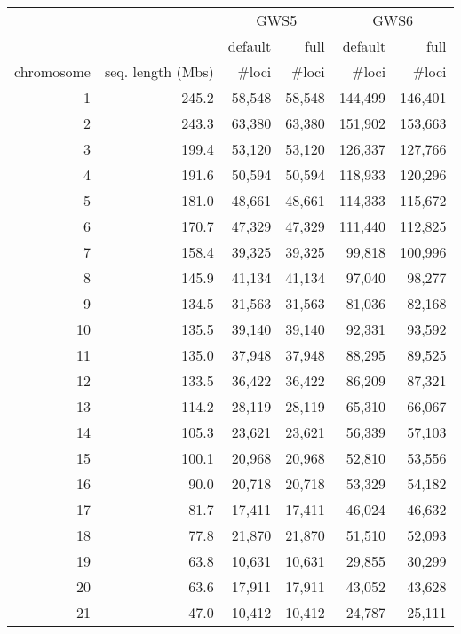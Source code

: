 \documentclass[10pt,a4paper]{article}
\newcommand{\GWSFive}{GWS5\xspace}
\newcommand{\GWSSix}{GWS6\xspace}
\begin{document}
\begin{table}[htp]
\begin{center}
\begin{tabular}{|r|r||rr||rr|}
\hline
     & & \multicolumn{2}{c||}{\GWSFive} & \multicolumn{2}{c|}{\GWSSix} \\
     & & default & full & default & full \\
chromosome & seq. length (Mbs) & \#loci & \#loci & \#loci & \#loci \\
\hline
\hline
1  & 245.2   & 58,548  &  58,548  &  144,499  &  146,401  \\
2  & 243.3   & 63,380  &  63,380  &  151,902  &  153,663  \\
3  & 199.4   & 53,120  &  53,120  &  126,337  &  127,766  \\
4  & 191.6   & 50,594  &  50,594  &  118,933  &  120,296  \\
5  & 181.0   & 48,661  &  48,661  &  114,333  &  115,672  \\
6  & 170.7   & 47,329  &  47,329  &  111,440  &  112,825  \\
7  & 158.4   & 39,325  &  39,325  &   99,818  &  100,996  \\
8  & 145.9   & 41,134  &  41,134  &   97,040  &   98,277  \\
9  & 134.5   & 31,563  &  31,563  &   81,036  &   82,168  \\
10 & 135.5   & 39,140  &  39,140  &   92,331  &   93,592  \\
\hline
11 & 135.0   & 37,948  &  37,948  &   88,295  &   89,525  \\
12 & 133.5   & 36,422  &  36,422  &   86,209  &   87,321  \\
13 & 114.2   & 28,119  &  28,119  &   65,310  &   66,067  \\
14 & 105.3   & 23,621  &  23,621  &   56,339  &   57,103  \\
15 & 100.1   & 20,968  &  20,968  &   52,810  &   53,556  \\
16 &  90.0   & 20,718  &  20,718  &   53,329  &   54,182  \\
17 &  81.7   & 17,411  &  17,411  &   46,024  &   46,632  \\
18 &  77.8   & 21,870  &  21,870  &   51,510  &   52,093  \\
19 &  63.8   & 10,631  &  10,631  &   29,855  &   30,299  \\
20 &  63.6   & 17,911  &  17,911  &   43,052  &   43,628  \\
\hline
21 &  47.0   & 10,412  &  10,412  &   24,787  &   25,111  \\

\end{tabular}
\end{center}
\end{table}
\end{document}

